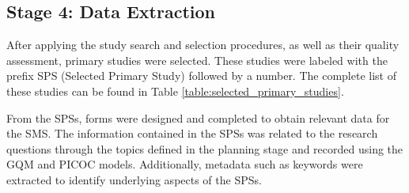 \subsection{Stage 4: Data Extraction}\label{sec:extraccion-de-datos}
After applying the study search and selection procedures, as well as their quality assessment, \totalEtapaDos{} primary studies were selected. These studies were labeled with the prefix SPS (Selected Primary Study) followed by a number. The complete list of these studies can be found in Table \ref{table:selected_primary_studies}.

From the \totalEtapaDos{} SPSs, forms were designed and completed to obtain relevant data for the SMS. The information contained in the SPSs was related to the research questions through the topics defined in the planning stage and recorded using the GQM and PICOC models. Additionally, metadata such as keywords were extracted to identify underlying aspects of the SPSs.

